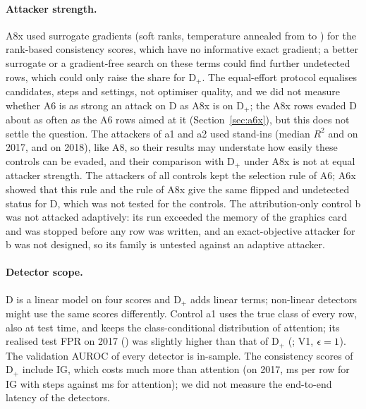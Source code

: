 \paragraph{Attacker strength.}
A8x used surrogate gradients (soft ranks, temperature annealed from \axTauStart{} to \axTauEnd) for the
\nRankScores{} rank-based consistency scores, which have no informative exact gradient; a better surrogate or a
gradient-free search on these terms could find further undetected rows, which could only raise the share for D$_+$.
The equal-effort protocol equalises candidates, steps and settings, not optimiser quality, and we did not measure
whether A6 is as strong an attack on D as A8x is on D$_+$; the A8x rows evaded D about as often as the A6 rows aimed at
it (Section~\ref{sec:a6x}), but this does not settle the question.
The attackers of a1 and a2 used stand-ins (median $R^2$ \rtwoMedAoneSeventeen{} and \rtwoMedAtwoSeventeen{} on 2017,
\rtwoMedAoneEighteen{} and \rtwoMedAtwoEighteen{} on 2018), like A8, so their results may understate how easily these
controls can be evaded, and their comparison with D$_+$ under A8x is not at equal attacker strength.
The attackers of all controls kept the selection rule of A6; A6x showed that this rule and the rule of A8x give the
same flipped and undetected status for D, which was not tested for the controls.
The attribution-only control b was not attacked adaptively: its run exceeded the memory of the graphics card and was
stopped before any row was written, and an exact-objective attacker for b was not designed, so its family is untested
against an adaptive attacker.

\paragraph{Detector scope.}
D is a linear model on four scores and D$_+$ adds \nConsistency{} linear terms; non-linear detectors might use the same
scores differently.
Control a1 uses the true class of every row, also at test time, and keeps the class-conditional distribution of
attention; its realised test FPR on 2017 (\ablFprAoneSeventeen) was slightly higher than that of D$_+$
(\ablFprDplusSeventeen; V1, $\epsilon = 1$).
The validation AUROC of every detector is in-sample.
The consistency scores of D$_+$ include IG, which costs much more than attention (on 2017, \msPerRowIGRange{} ms per
row for IG with \apIGSteps{} steps against \msPerRowAttnRange{} ms for attention); we did not measure the end-to-end
latency of the detectors.

